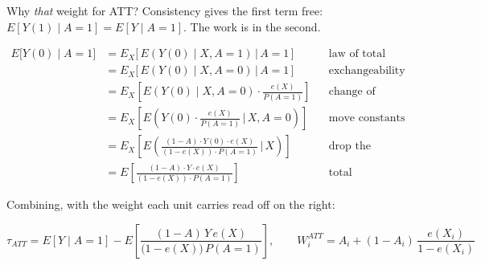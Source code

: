 \documentclass[
  11pt,
  ignorenonframetext,
  aspectratio=169,
]{beamer}
\begin{document}
\begin{frame}{Why \emph{that} weight for ATT?}
\protect{}\label{why-that-weight-for-att}
Consistency gives the first term free:
\(E[Y(1) \mid A{=}1] = E[Y \mid A{=}1]\). The work is in the second.

\scriptsize

\[
\begin{aligned}
E\big[Y(0) \mid A{=}1\big]
  &= E_X\big[\, E(Y(0) \mid X, A{=}1) \,\big|\, A{=}1 \,\big]
     && \text{law of total expectation} \\
  &= E_X\big[\, E(Y(0) \mid X, A{=}0) \,\big|\, A{=}1 \,\big]
     && \text{exchangeability} \\
  &= E_X\!\left[ E(Y(0) \mid X, A{=}0) \cdot \frac{e(X)}{P(A{=}1)} \right]
     && \text{change of measure / density shift} \\
  &= E_X\!\left[ E\!\left( Y(0) \cdot \frac{e(X)}{P(A{=}1)} \,\Big|\, X, A{=}0 \right) \right]
     && \text{move constants inside} \\
  &= E_X\!\left[ E\!\left( \frac{(1 - A) \cdot Y(0) \cdot e(X)}{(1 - e(X)) \cdot P(A{=}1)} \,\Big|\, X \right) \right]
     && \text{drop the condition: control shift} \\
  &= E\!\left[ \frac{(1 - A) \cdot Y \cdot e(X)}{(1 - e(X)) \cdot P(A{=}1)} \right]
     && \text{total expectation; consistency}
\end{aligned}
\] \normalsize

Combining, with the weight each unit carries read off on the right:

\vspace{-0.6em}
\small

\[
\tau_{ATT} = E[Y \mid A{=}1] - E\!\left[ \frac{(1 - A)\,Y\,e(X)}{\big(1 - e(X)\big)\,P(A{=}1)} \right],
\qquad
W_i^{ATT} = A_i + (1 - A_i)\,\frac{e(X_i)}{1 - e(X_i)}
\] \normalsize
\end{frame}
\end{document}
